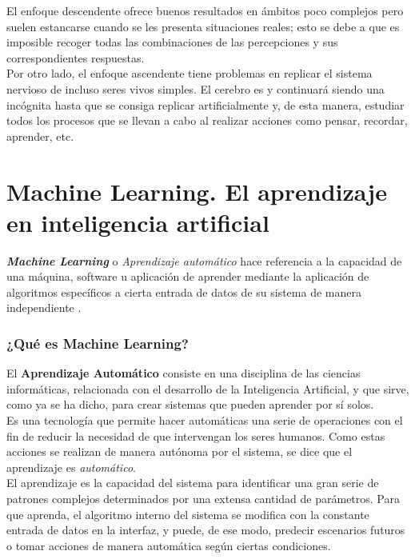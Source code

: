 El enfoque descendente ofrece buenos resultados en ámbitos poco complejos pero suelen estancarse cuando se les presenta situaciones reales; esto se debe a que es imposible recoger todas las combinaciones de las percepciones y sus correspondientes respuestas. \\

Por otro lado, el enfoque ascendente tiene problemas en replicar el sistema nervioso de incluso seres vivos simples. El cerebro es y continuará siendo una incógnita hasta que se consiga replicar artificialmente y, de esta manera, estudiar todos los procesos que se llevan a cabo al realizar acciones como pensar, recordar, aprender, etc. 

\section{Machine Learning. El aprendizaje en inteligencia artificial}


\textbf{\textit{Machine Learning}} o \textit{Aprendizaje automático} hace referencia a la capacidad de una máquina, software u aplicación de aprender mediante la aplicación de algoritmos específicos a cierta entrada de datos de su sistema de manera independiente \cite{apd2019ml}.

\subsubsection{¿Qué es Machine Learning?}
El \textbf{Aprendizaje Automático} consiste en una disciplina de las ciencias informáticas, relacionada con el desarrollo de la Inteligencia Artificial, y que sirve, como ya se ha dicho, para crear sistemas que pueden aprender por sí solos. \\

Es una tecnología que permite hacer automáticas una serie de operaciones con el fin de reducir la necesidad de que intervengan los seres humanos. Como estas acciones se realizan de manera autónoma por el sistema, se dice que el aprendizaje es \textit{automático}.\\

El aprendizaje es la capacidad del sistema para identificar una gran serie de patrones complejos determinados por una extensa cantidad de parámetros. Para que aprenda, el algoritmo interno del sistema se modifica con la constante entrada de datos en la interfaz, y puede, de ese modo, predecir escenarios futuros o tomar acciones de manera automática según ciertas condiciones.

